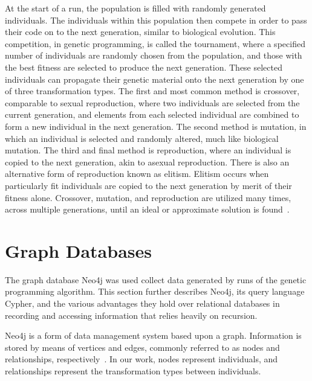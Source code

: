 \documentclass[12pt]{article}
\begin{document}
At the start of a run, the population is filled with randomly generated individuals. The individuals within this population then compete in order to pass their code on to the next generation, similar to biological evolution. This competition, in genetic programming, is called the tournament, where a specified number of individuals are randomly chosen from the population, and those with the best fitness are selected to produce the next generation. These selected individuals can propagate their genetic material onto the next generation by one of three transformation types. The first and most common method is crossover, comparable to sexual reproduction, where two individuals are selected from the current generation, and elements from each selected individual are combined to form a new individual in the next generation. The second method is mutation, in which an individual is selected and randomly altered, much like biological mutation. The third and final method is reproduction, where an individual is copied to the next generation, akin to asexual reproduction. There is also an alternative form of reproduction known as elitism. Elitism occurs when particularly fit individuals are copied to the next generation by merit of their fitness alone. Crossover, mutation, and reproduction are utilized many times, across multiple generations, until an ideal or approximate solution is found~\cite{poli08:fieldguide}.

\section{Graph Databases}
\label{sec:Graph Databases}

The graph database Neo4j was used collect data generated by runs of the genetic programming algorithm. This section further describes Neo4j, its query language Cypher, and the various advantages they hold over relational databases in recording and accessing information that relies heavily on recursion.

Neo4j is a form of data management system based upon a graph. Information is stored by means of vertices and edges, commonly referred to as nodes and relationships, respectively~\cite{GraphDatabases:2013}. In our work, nodes represent individuals, and relationships represent the transformation types between individuals.
\end{document}
